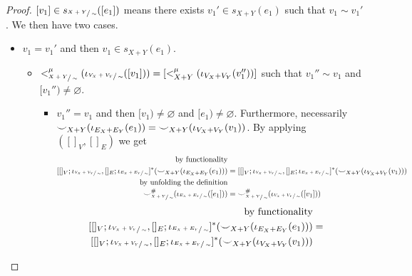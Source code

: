 \begin{proof}
    $[v_1] \in s_{\sfrac{X+Y}{\sim}}([e_1])$ means there exists $v_1' \in s_{X+Y}(e_1)$ such that $v_1 \sim v_1'$.
    We then have two cases.
    \begin{itemize}
      \item $v_1 = v_1'$ and then $v_1 \in s_{X+Y}(e_1)$.
      \begin{itemize}
         \item $<_{\sfrac{X+Y}{\sim}}^{\mu}(\iota_{\sfrac{V_{X} + V_{Y}}{\sim}}([v_1])) = [<_{X+Y}^{\mu}(\iota_{V_{X} + V_{Y}}(v_1''))]$ such that $v_1'' \sim v_1$ and $[v_1'') \not = \varnothing$.
            \begin{itemize}
                \item $v_1'' = v_1$ and then $[v_1) \not = \varnothing$ and $[e_1) \not = \varnothing$.
                      Furthermore, necessarily ${\smile}_{X+Y}(\iota_{E_{X} + E_{Y}}(e_1)) = {\smile}_{X+Y}(\iota_{V_{X} + V_{Y}}(v_1))$.
                      By applying $([]_{V},[]_{E})$ we get
                      \ifdefined \ONECOLUMN
                      \begin{align*}
                        \text{by functionality}\\
                          [[]_{V};\iota_{\sfrac{V_{X} + V_{Y}}{\sim}},[]_{E};\iota_{\sfrac{E_{X} + E_{Y}}{\sim}}]^{*}({\smile}_{X+Y}(\iota_{E_{X} + E_{Y}}(e_1))) &=
                          [[]_{V};\iota_{\sfrac{V_{X} + V_{Y}}{\sim}},[]_{E};\iota_{\sfrac{E_{X} + E_{Y}}{\sim}}]^{*}({\smile}_{X+Y}(\iota_{V_{X} + V_{Y}}(v_1)))\\
                          \text{by unfolding the definition}\\
                          {\smile}_{\sfrac{X+Y}{\sim}}^{{\#}}(\iota_{\sfrac{E_{X} + E_{Y}}{\sim}}([e_1])) &= {\smile}_{\sfrac{X+Y}{\sim}}^{{\#}}(\iota_{\sfrac{V_{X} + V_{Y}}{\sim}}([v_1]))\\
                          \end{align*} 
                      \else
                      \begin{align*}
                      \text{by functionality}\\
                        [[]_{V};\iota_{\sfrac{V_{X} + V_{Y}}{\sim}},[]_{E};\iota_{\sfrac{E_{X} + E_{Y}}{\sim}}]^{*}(\consistency_{X+Y}(\iota_{E_{X} + E_{Y}}(e_1))) &=\\
                        [[]_{V};\iota_{\sfrac{V_{X} + V_{Y}}{\sim}},[]_{E};\iota_{\sfrac{E_{X} + E_{Y}}{\sim}}]^{*}(\consistency_{X+Y}(\iota_{V_{X} + V_{Y}}(v_1))) &\\

\end{align*}
\end{itemize}
\end{itemize}
\end{itemize}
\end{proof}
